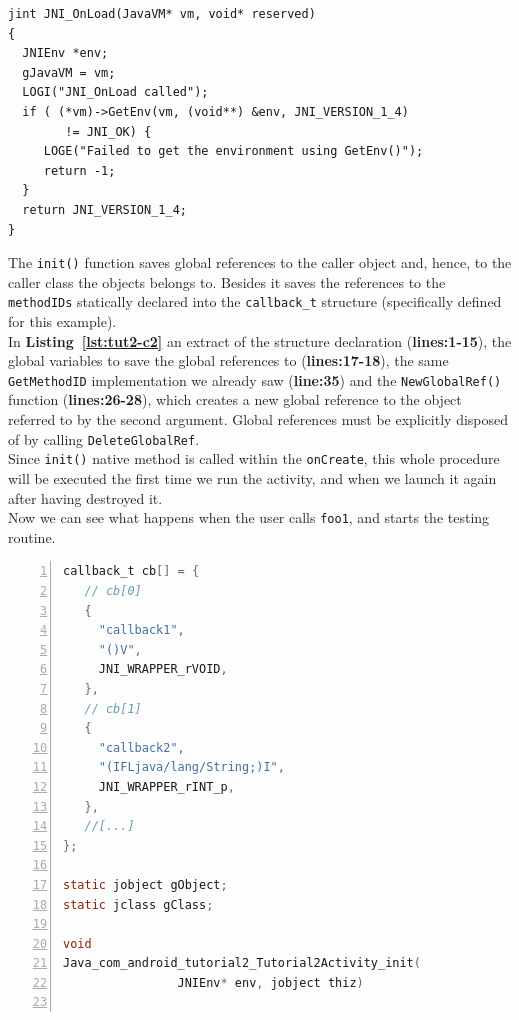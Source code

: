 \documentclass[a4paper,10pt]{article}
\newcommand{\keyword}[1]{\texttt{#1}}
\newcommand{\refl}[1]{\textbf{Listing~\ref{#1}}}
\begin{document}
\begin{multicols}{2}
\begin{lstlisting}
jint JNI_OnLoad(JavaVM* vm, void* reserved)
{
  JNIEnv *env;
  gJavaVM = vm;
  LOGI("JNI_OnLoad called");
  if ( (*vm)->GetEnv(vm, (void**) &env, JNI_VERSION_1_4)
  		!= JNI_OK) {
     LOGE("Failed to get the environment using GetEnv()");
     return -1;
  }
  return JNI_VERSION_1_4;
}
\end{lstlisting}
The \keyword{init()} function saves global references to the caller object and,
hence, to the caller class the objects belongs to. Besides it saves the
references to the \keyword{methodIDs} statically declared into the
\keyword{callback\_t} structure (specifically defined for this example).\\
In \refl{lst:tut2-c2} an extract of the structure declaration
(\textbf{lines:1-15}), the global variables to save the global references to
(\textbf{lines:17-18}), the same \keyword{GetMethodID} implementation we already
saw (\textbf{line:35}) and the \keyword{NewGlobalRef()} function
(\textbf{lines:26-28}), which creates a new global reference to the object
referred to by the second argument. Global references must be explicitly
disposed of by calling \keyword{DeleteGlobalRef}.\\
Since \keyword{init()} native method is called within the \keyword{onCreate},
this whole procedure will be executed the first time we run the activity, and
when we launch it again after having destroyed it.\\
Now we can see what happens when the user calls \keyword{foo1}, and starts the
testing routine.
\begin{lstlisting}[language=C,
		   columns=fullflexible,
		   showstringspaces=false,
		   xleftmargin=15pt,
		   frame = l,
		   numbers=left,
		   commentstyle=\color{gray}\upshape,
		   caption=Part of tutorial2.c - init(),
		   label=lst:tut2-c2]
callback_t cb[] = {
   // cb[0]
   {
     "callback1",
     "()V",
     JNI_WRAPPER_rVOID,
   },
   // cb[1]
   {
     "callback2",
     "(IFLjava/lang/String;)I",
     JNI_WRAPPER_rINT_p,
   },
   //[...]
};

static jobject gObject;
static jclass gClass;

void
Java_com_android_tutorial2_Tutorial2Activity_init(
				JNIEnv* env, jobject thiz)


\end{lstlisting}
\end{multicols}
\end{document}
